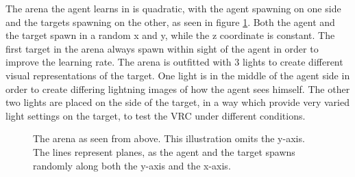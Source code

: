 The arena the agent learns in is quadratic, with the agent spawning on one side and the targets spawning on the other, as seen in figure \ref{fig:arena}. Both the agent and the target spawn in a random x and y, while the z coordinate is constant. The first target in the arena always spawn within sight of the agent in order to improve the learning rate. The arena is outfitted with 3 lights to create different visual representations of the target. One light is in the middle of the agent side in order to create differing lightning images of how the agent sees himself. The other two lights are placed on the side of the target, in a way which provide very varied light settings on the target, to test the VRC under different conditions.

\begin{figure}[H]
	\centering
	\begin{scriptsize}
		\sffamily
		
	\end{scriptsize}
	\caption[The FPS game arena]{The arena as seen from above. This illustration omits the y-axis. The lines represent planes, as the agent and the target spawns randomly along both the y-axis and the x-axis.}
	\label{fig:arena}
\end{figure}



















































